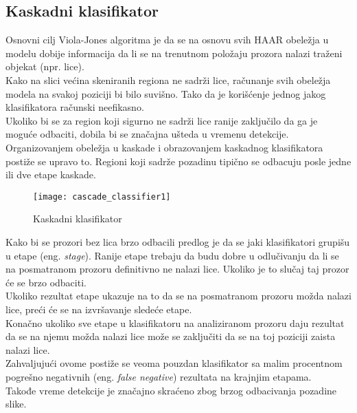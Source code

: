 \subsection{Kaskadni klasifikator}

Osnovni cilj Viola-Jones algoritma je da se na osnovu svih HAAR obeležja u modelu dobije informacija da li se na
trenutnom položaju prozora nalazi traženi objekat (npr. lice).\\
Kako na slici većina skeniranih regiona ne sadrži lice, računanje svih obeležja modela
na svakoj poziciji bi bilo suvišno.
Tako da je korišćenje jednog jakog klasifikatora računski neefikasno. \\

Ukoliko bi se za region koji sigurno ne sadrži lice ranije zaključilo da ga je
moguće odbaciti, dobila bi se značajna ušteda u vremenu detekcije. \\
Organizovanjem obeležja u kaskade i obrazovanjem kaskadnog klasifikatora postiže
se upravo to.
Regioni koji sadrže pozadinu tipično se odbacuju posle jedne ili dve etape
kaskade. \\

\begin{figure}[H]
  \centering
  \texttt{[image: cascade\_classifier1]}
  \caption{Kaskadni klasifikator \cite{Jensen2008ImplementingTV}}
  \label{cascade_classifier_img1}
\end{figure}

Kako bi se prozori bez lica brzo odbacili predlog je da se jaki klasifikatori
grupišu u etape (eng. \emph{stage}). Ranije etape trebaju da budu dobre u
odlučivanju da li se na posmatranom prozoru definitivno ne nalazi lice.
Ukoliko je to slučaj taj prozor će se brzo odbaciti. \\
Ukoliko rezultat etape ukazuje na to da se na posmatranom prozoru možda nalazi lice, preći
će se na izvršavanje sledeće etape. \\

Konačno ukoliko sve etape u klasifikatoru na analiziranom prozoru daju rezultat
da se na njemu možda nalazi lice može se zaključiti da se na toj poziciji zaista nalazi lice. \\
Zahvaljujući ovome postiže se veoma pouzdan klasifikator sa malim procentnom
pogrešno negativnih (eng. \emph{false negative}) rezultata na krajnjim etapama. \\
Takođe vreme detekcije je značajno skraćeno zbog brzog odbacivanja pozadine
slike. \\

